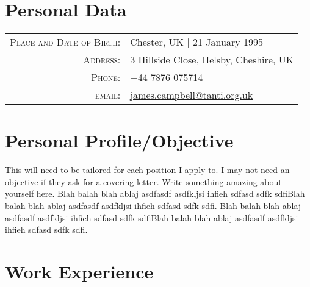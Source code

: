 \documentclass[a4paper, 11pt]{article}
\begin{document}
\pagestyle{empty} %
\par{
\section{Personal Data}

\begin{tabular}{rl}

\textsc{Place and Date of Birth:} & Chester, UK  | 21 January 1995 \\
\textsc{Address:} & 3 Hillside Close, Helsby, Cheshire, UK \\
\textsc{Phone:} & +44 7876 075714\\
\textsc{email:} & \href{mailto:james.campbell@tanti.org.uk}{james.campbell@tanti.org.uk}

\end{tabular}
\section{Personal Profile/Objective}
\begin{flushleft}
This will need to be tailored for each position I apply to. I may not need an objective if they ask for a covering letter.
Write something amazing about yourself here. Blah balah blah ablaj asdfasdf asdfkljsi ihfieh sdfasd sdfk sdfiBlah balah blah ablaj asdfasdf asdfkljsi ihfieh sdfasd sdfk sdfi. Blah balah blah ablaj asdfasdf asdfkljsi ihfieh sdfasd sdfk sdfiBlah balah blah ablaj asdfasdf asdfkljsi ihfieh sdfasd sdfk sdfi.
\end{flushleft}
\section{Work Experience}
\begin{tabular}{r|p{11cm}}


\end{tabular}}
\end{document}
